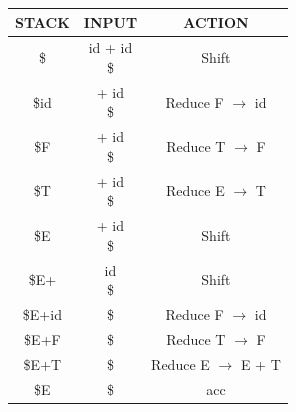 \documentclass{article}
\author{Michael Movsesyan}
\begin{document}
\maketitle

\begin{tabular}{|c|c|c|}
\hline
STACK & INPUT & ACTION \\
\hline
\$ & id + id $$$$\$ & Shift \\ \hline
\$id & + id $$$$\$ & Reduce F $\to$ id  \\ \hline
\$F & + id $$$$\$ & Reduce T $\to$ F  \\ \hline
\$T & + id $$$$\$ & Reduce E $\to$ T  \\ \hline
\$E & + id $$$$\$ & Shift \\ \hline
\$E+ & id $$$$\$ & Shift \\ \hline
\$E+id & $$$$\$ & Reduce F $\to$ id  \\ \hline
\$E+F & $$$$\$ & Reduce T $\to$ F  \\ \hline
\$E+T & $$$$\$ & Reduce E $\to$ E + T  \\ \hline
\$E & $$$$\$ & acc \\ \hline
\end{tabular}
\end{document}
